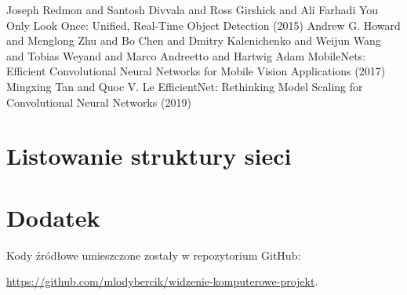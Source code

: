 \documentclass[10pt]{article}
\begin{document}
\begin{thebibliography}{9}
  Joseph Redmon and Santosh Divvala and Ross Girshick and Ali Farhadi
  You Only Look Once: Unified, Real-Time Object Detection (2015)
  Andrew G. Howard and Menglong Zhu and Bo Chen and Dmitry Kalenichenko and Weijun Wang and Tobias Weyand and Marco Andreetto and Hartwig Adam
  MobileNets: Efficient Convolutional Neural Networks for Mobile Vision Applications (2017) 
  Mingxing Tan and Quoc V. Le
  EfficientNet: Rethinking Model Scaling for Convolutional Neural Networks (2019)
\end{thebibliography}

\appendix

\section{Listowanie struktury sieci}
\label{app:listowanie}
\begin{center}
  
\end{center}

\section{Dodatek}
Kody źródłowe umieszczone zostały w repozytorium GitHub:

\noindent \url{https://github.com/mlodybercik/widzenie-komputerowe-projekt}.
\end{document}
